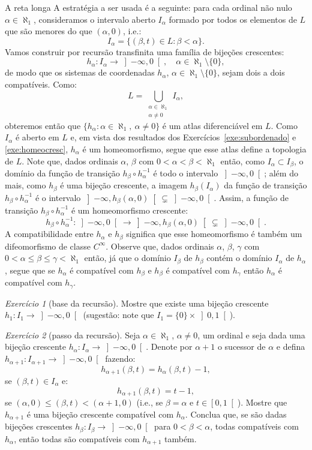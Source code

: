 \documentclass[oneside,11pt]{amsart}
\theoremstyle{remark}\newtheorem{exercise}{Exercício}[section]
\theoremstyle{plain}\newtheorem{teo}{Teorema}[section]
\theoremstyle{plain}\newtheorem{lem}[teo]{Lema}
\theoremstyle{plain}\newtheorem{prop}[teo]{Proposição}
\theoremstyle{definition}\newtheorem{defin}[teo]{Definição}
\theoremstyle{remark}\newtheorem{rem}[teo]{Observação}
\theoremstyle{definition}\newtheorem{example}[teo]{Exemplo}
\numberwithin{equation}{section}
\begin{document}
\begin{section}{A reta longa}
A estratégia a ser usada é a seguinte: para cada ordinal não nulo $\alpha\in\aleph_1$, consideramos o intervalo aberto $I_\alpha$ formado por todos os elementos
de $L$ que são menores do que $(\alpha,0)$, i.e.:
\[I_\alpha=\big\{(\beta,t)\in L:\beta<\alpha\big\}.\]
Vamos construir por recursão transfinita uma família de bijeções crescentes:
\[h_\alpha:I_\alpha\longrightarrow\left]-\infty,0\right[,\quad\alpha\in\aleph_1\setminus\{0\},\]
de modo que os sistemas de coordenadas $h_\alpha$, $\alpha\in\aleph_1\setminus\{0\}$, sejam dois a dois compatíveis. Como:
\[L=\bigcup_{\substack{\alpha\in\aleph_1\\\alpha\ne0}}I_\alpha,\]
obteremos então que $\big\{h_\alpha:\alpha\in\aleph_1,\ \alpha\ne0\big\}$ é um atlas diferenciável em $L$. Como $I_\alpha$ é aberto
em $L$ e, em vista dos resultados dos Exercícios~\ref{exe:subordenado} e \ref{exe:homeocresc}, $h_\alpha$ é um homeomorfismo,
segue que esse atlas define a topologia de $L$. Note que, dados ordinais $\alpha$, $\beta$ com $0<\alpha<\beta<\aleph_1$ então, como $I_\alpha\subset I_\beta$,
o domínio da função de transição $h_\beta\circ h_\alpha^{-1}$ é todo o intervalo $\left]-\infty,0\right[$; além do mais, como $h_\beta$ é uma bijeção crescente,
a imagem $h_\beta(I_\alpha)$ da função de transição $h_\beta\circ h_\alpha^{-1}$
é o intervalo $\left]-\infty,h_\beta(\alpha,0)\right[\varsubsetneq\left]-\infty,0\right[$. Assim, a função de transição $h_\beta\circ h_\alpha^{-1}$
é um homeomorfismo crescente:
\[h_\beta\circ h_\alpha^{-1}:\left]-\infty,0\right[\longrightarrow\left]-\infty,h_\beta(\alpha,0)\right[\varsubsetneq\left]-\infty,0\right[.\]
A compatibilidade entre $h_\alpha$ e $h_\beta$ significa que esse homeomorfismo é também um difeomorfismo de classe $C^\infty$.
Observe que, dados ordinais $\alpha$, $\beta$, $\gamma$
com $0<\alpha\le\beta\le\gamma<\aleph_1$ então, já que o domínio $I_\beta$ de $h_\beta$ contém o domínio $I_\alpha$ de $h_\alpha$, segue que se $h_\alpha$
é compatível com $h_\beta$ e $h_\beta$ é compatível com $h_\gamma$ então $h_\alpha$ é compatível com $h_\gamma$.

\begin{exercise}[base da recursão]
Mostre que existe uma bijeção crescente $h_1:I_1\to\left]-\infty,0\right[$ (sugestão: note que $I_1=\{0\}\times\left]0,1\right[$).
\end{exercise}

\begin{exercise}[passo da recursão]
Seja $\alpha\in\aleph_1$, $\alpha\ne0$, um ordinal e seja dada uma bijeção crescente $h_\alpha:I_\alpha\to\left]-\infty,0\right[$. Denote
por $\alpha+1$ o sucessor de $\alpha$ e defina $h_{\alpha+1}:I_{\alpha+1}\to\left]-\infty,0\right[$ fazendo:
\[h_{\alpha+1}(\beta,t)=h_\alpha(\beta,t)-1,\]
se $(\beta,t)\in I_\alpha$ e:
\[h_{\alpha+1}(\beta,t)=t-1,\]
se $(\alpha,0)\le(\beta,t)<(\alpha+1,0)$ (i.e., se $\beta=\alpha$ e $t\in\left[0,1\right[$). Mostre que $h_{\alpha+1}$ é uma bijeção crescente compatível
com $h_\alpha$. Conclua que, se são dadas bijeções crescentes $h_\beta:I_\beta\to\left]-\infty,0\right[$ para $0<\beta<\alpha$, todas compatíveis
com $h_\alpha$, então todas são compatíveis com $h_{\alpha+1}$ também.
\end{exercise}


\end{section}
\end{document}
